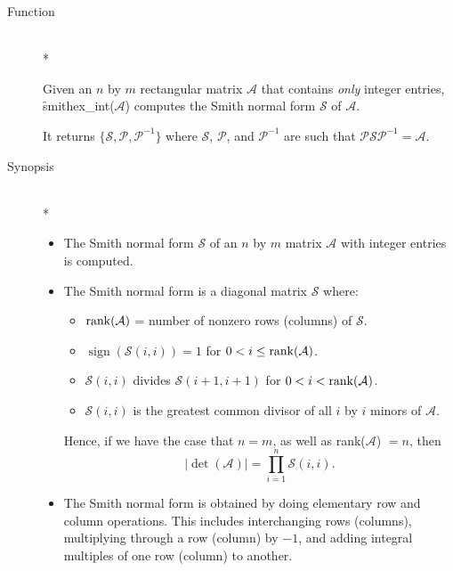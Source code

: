\begin{description}
\item[Function]\mbox{}\\*

Given an $n$ by $m$ rectangular matrix $\mathcal{A}$ that contains 
\emph{only} integer entries, \f{smithex\_int}($\mathcal{A}$) computes the
Smith normal form $\mathcal{S}$ of $\mathcal{A}$.

It returns $\{\mathcal{S}, \mathcal{P}, \mathcal{ P}^{-1}\}$ where $\mathcal{S}$,
$\mathcal{P}$, and $\mathcal{ P}^{-1}$ are such that $\mathcal{P S P}^{-1} = 
\mathcal{A}$.


\item[Synopsis]\mbox{}\\*

\begin{itemize}
\item The Smith normal form $\mathcal{ S}$ of an $n$ by $m$ matrix 
$\mathcal{ A}$ with integer entries is computed.

\item The Smith normal form is a diagonal matrix $\mathcal{ S}$ where:

  \begin{itemize}
  \item $\mathop{\mathrm{rank}}(\mathcal{A})$ = number of nonzero rows (columns) of 
        $\mathcal{S}$.
  \item $\mathop{\mathrm{sign}}(\mathcal{S}(i,i)) = 1$ for $0 < i \leq \mathop{\mathrm{rank}}(\mathcal{A})$.
  \item $\mathcal{S}(i,i)$ divides $\mathcal{S}(i+1,i+1)$ for $0< i < \mathop{\mathrm{rank}}(\mathcal{A})$.
  \item $\mathcal{S}(i,i)$ is the greatest common divisor of all $i$ by 
        $i$ minors of $\mathcal{A}$.
  \end{itemize}

      Hence, if we have the case that $n = m$, as well as 
      rank($\mathcal{A}$) $= n$, then 
      \begin{displaymath}
        \left|\det(\mathcal{A})\right| = \prod_{i=1}^{n} \mathcal{S}(i,i) .
      \end{displaymath}
      
\item The Smith normal form is obtained by doing elementary row and 
      column operations. This includes interchanging rows (columns),
      multiplying through a row (column) by $-1$, and adding integral 
      multiples of one row (column) to another. 
\end{itemize}


\end{description}
